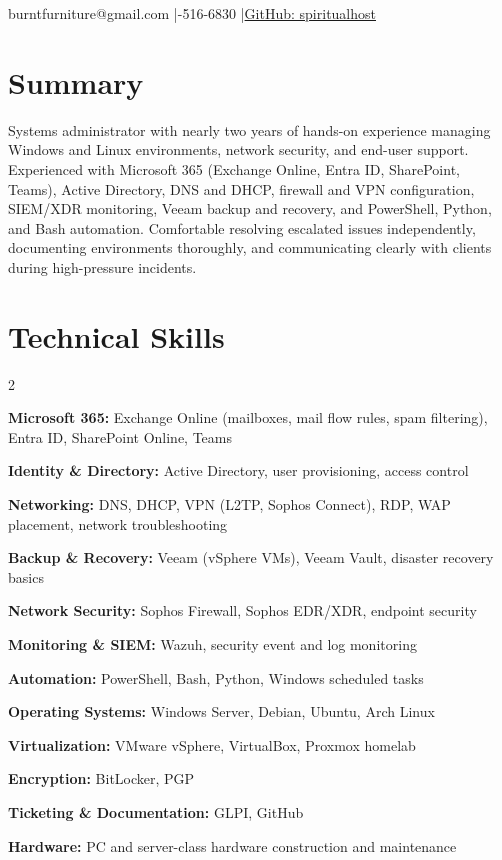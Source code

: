 \documentclass{article}
\makeatletter
\renewcommand{\maketitle}{
	\begin{center}
		{\huge\bfseries\theauthor}

		\vspace{.25em}

		burntfurniture@gmail.com \quad|\quad 443-516-6830 \quad|\quad \href{https://github.com/spiritualhost}{GitHub: spiritualhost}
	\end{center}
}
\makeatother
\begin{document}
\noindent

\author{Ryan Piazza}

\maketitle

\section{Summary}

Systems administrator with nearly two years of hands-on experience managing Windows and Linux environments, network security, and end-user support. Experienced with Microsoft 365 (Exchange Online, Entra ID, SharePoint, Teams), Active Directory, DNS and DHCP, firewall and VPN configuration, SIEM/XDR monitoring, Veeam backup and recovery, and PowerShell, Python, and Bash automation. Comfortable resolving escalated issues independently, documenting environments thoroughly, and communicating clearly with clients during high-pressure incidents.

\section{Technical Skills}

\vspace{-0.5em}
\begin{multicols}{2}
	\begin{compactitem}
		\item \textbf{Microsoft 365:} Exchange Online (mailboxes, mail flow rules, spam filtering), Entra ID, SharePoint Online, Teams
		\item \textbf{Identity \& Directory:} Active Directory, user provisioning, access control
		\item \textbf{Networking:} DNS, DHCP, VPN (L2TP, Sophos Connect), RDP, WAP placement, network troubleshooting
		\item \textbf{Backup \& Recovery:} Veeam (vSphere VMs), Veeam Vault, disaster recovery basics
		\item \textbf{Network Security:} Sophos Firewall, Sophos EDR/XDR, endpoint security
		\item \textbf{Monitoring \& SIEM:} Wazuh, security event and log monitoring
		\item \textbf{Automation:} PowerShell, Bash, Python, Windows scheduled tasks
		\item \textbf{Operating Systems:} Windows Server, Debian, Ubuntu, Arch Linux
		\item \textbf{Virtualization:} VMware vSphere, VirtualBox, Proxmox homelab
		\item \textbf{Encryption:} BitLocker, PGP
		\item \textbf{Ticketing \& Documentation:} GLPI, GitHub
		\item \textbf{Hardware:} PC and server-class hardware construction and maintenance
	\end{compactitem}
\end{multicols}
\end{document}
